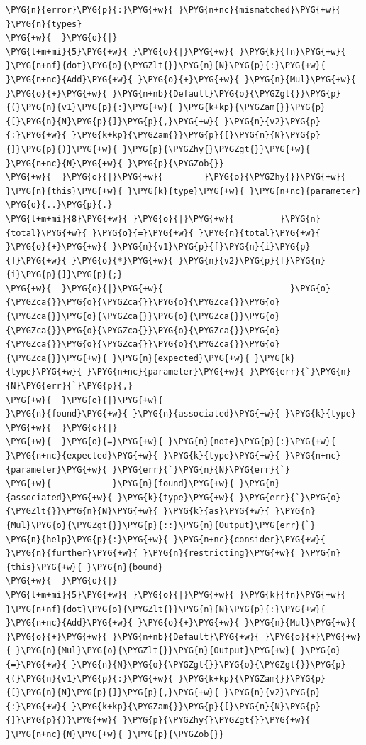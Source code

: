 \begin{Verbatim}[commandchars=\\\{\},breaklines=true,breakanywhere=true,fontsize=\codefont,xleftmargin=17bp]
\PYG{n}{error}\PYG{p}{:}\PYG{+w}{ }\PYG{n+nc}{mismatched}\PYG{+w}{ }\PYG{n}{types}
\PYG{+w}{  }\PYG{o}{|}
\PYG{l+m+mi}{5}\PYG{+w}{ }\PYG{o}{|}\PYG{+w}{ }\PYG{k}{fn}\PYG{+w}{ }\PYG{n+nf}{dot}\PYG{o}{\PYGZlt{}}\PYG{n}{N}\PYG{p}{:}\PYG{+w}{ }\PYG{n+nc}{Add}\PYG{+w}{ }\PYG{o}{+}\PYG{+w}{ }\PYG{n}{Mul}\PYG{+w}{ }\PYG{o}{+}\PYG{+w}{ }\PYG{n+nb}{Default}\PYG{o}{\PYGZgt{}}\PYG{p}{(}\PYG{n}{v1}\PYG{p}{:}\PYG{+w}{ }\PYG{k+kp}{\PYGZam{}}\PYG{p}{[}\PYG{n}{N}\PYG{p}{]}\PYG{p}{,}\PYG{+w}{ }\PYG{n}{v2}\PYG{p}{:}\PYG{+w}{ }\PYG{k+kp}{\PYGZam{}}\PYG{p}{[}\PYG{n}{N}\PYG{p}{]}\PYG{p}{)}\PYG{+w}{ }\PYG{p}{\PYGZhy{}\PYGZgt{}}\PYG{+w}{ }\PYG{n+nc}{N}\PYG{+w}{ }\PYG{p}{\PYGZob{}}
\PYG{+w}{  }\PYG{o}{|}\PYG{+w}{        }\PYG{o}{\PYGZhy{}}\PYG{+w}{ }\PYG{n}{this}\PYG{+w}{ }\PYG{k}{type}\PYG{+w}{ }\PYG{n+nc}{parameter}
\PYG{o}{..}\PYG{p}{.}
\PYG{l+m+mi}{8}\PYG{+w}{ }\PYG{o}{|}\PYG{+w}{         }\PYG{n}{total}\PYG{+w}{ }\PYG{o}{=}\PYG{+w}{ }\PYG{n}{total}\PYG{+w}{ }\PYG{o}{+}\PYG{+w}{ }\PYG{n}{v1}\PYG{p}{[}\PYG{n}{i}\PYG{p}{]}\PYG{+w}{ }\PYG{o}{*}\PYG{+w}{ }\PYG{n}{v2}\PYG{p}{[}\PYG{n}{i}\PYG{p}{]}\PYG{p}{;}
\PYG{+w}{  }\PYG{o}{|}\PYG{+w}{                         }\PYG{o}{\PYGZca{}}\PYG{o}{\PYGZca{}}\PYG{o}{\PYGZca{}}\PYG{o}{\PYGZca{}}\PYG{o}{\PYGZca{}}\PYG{o}{\PYGZca{}}\PYG{o}{\PYGZca{}}\PYG{o}{\PYGZca{}}\PYG{o}{\PYGZca{}}\PYG{o}{\PYGZca{}}\PYG{o}{\PYGZca{}}\PYG{o}{\PYGZca{}}\PYG{o}{\PYGZca{}}\PYG{+w}{ }\PYG{n}{expected}\PYG{+w}{ }\PYG{k}{type}\PYG{+w}{ }\PYG{n+nc}{parameter}\PYG{+w}{ }\PYG{err}{`}\PYG{n}{N}\PYG{err}{`}\PYG{p}{,}
\PYG{+w}{  }\PYG{o}{|}\PYG{+w}{                                       }\PYG{n}{found}\PYG{+w}{ }\PYG{n}{associated}\PYG{+w}{ }\PYG{k}{type}
\PYG{+w}{  }\PYG{o}{|}
\PYG{+w}{  }\PYG{o}{=}\PYG{+w}{ }\PYG{n}{note}\PYG{p}{:}\PYG{+w}{ }\PYG{n+nc}{expected}\PYG{+w}{ }\PYG{k}{type}\PYG{+w}{ }\PYG{n+nc}{parameter}\PYG{+w}{ }\PYG{err}{`}\PYG{n}{N}\PYG{err}{`}
\PYG{+w}{            }\PYG{n}{found}\PYG{+w}{ }\PYG{n}{associated}\PYG{+w}{ }\PYG{k}{type}\PYG{+w}{ }\PYG{err}{`}\PYG{o}{\PYGZlt{}}\PYG{n}{N}\PYG{+w}{ }\PYG{k}{as}\PYG{+w}{ }\PYG{n}{Mul}\PYG{o}{\PYGZgt{}}\PYG{p}{::}\PYG{n}{Output}\PYG{err}{`}
\PYG{n}{help}\PYG{p}{:}\PYG{+w}{ }\PYG{n+nc}{consider}\PYG{+w}{ }\PYG{n}{further}\PYG{+w}{ }\PYG{n}{restricting}\PYG{+w}{ }\PYG{n}{this}\PYG{+w}{ }\PYG{n}{bound}
\PYG{+w}{  }\PYG{o}{|}
\PYG{l+m+mi}{5}\PYG{+w}{ }\PYG{o}{|}\PYG{+w}{ }\PYG{k}{fn}\PYG{+w}{ }\PYG{n+nf}{dot}\PYG{o}{\PYGZlt{}}\PYG{n}{N}\PYG{p}{:}\PYG{+w}{ }\PYG{n+nc}{Add}\PYG{+w}{ }\PYG{o}{+}\PYG{+w}{ }\PYG{n}{Mul}\PYG{+w}{ }\PYG{o}{+}\PYG{+w}{ }\PYG{n+nb}{Default}\PYG{+w}{ }\PYG{o}{+}\PYG{+w}{ }\PYG{n}{Mul}\PYG{o}{\PYGZlt{}}\PYG{n}{Output}\PYG{+w}{ }\PYG{o}{=}\PYG{+w}{ }\PYG{n}{N}\PYG{o}{\PYGZgt{}}\PYG{o}{\PYGZgt{}}\PYG{p}{(}\PYG{n}{v1}\PYG{p}{:}\PYG{+w}{ }\PYG{k+kp}{\PYGZam{}}\PYG{p}{[}\PYG{n}{N}\PYG{p}{]}\PYG{p}{,}\PYG{+w}{ }\PYG{n}{v2}\PYG{p}{:}\PYG{+w}{ }\PYG{k+kp}{\PYGZam{}}\PYG{p}{[}\PYG{n}{N}\PYG{p}{]}\PYG{p}{)}\PYG{+w}{ }\PYG{p}{\PYGZhy{}\PYGZgt{}}\PYG{+w}{ }\PYG{n+nc}{N}\PYG{+w}{ }\PYG{p}{\PYGZob{}}

\end{Verbatim}
